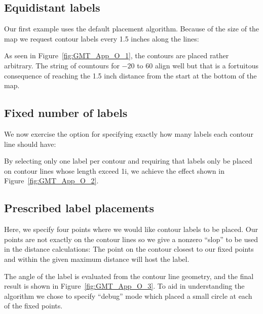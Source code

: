 \subsection{Equidistant labels}

Our first example uses the default placement algorithm.  Because of the size
of the map we request contour labels every 1.5 inches along the lines:



\noindent
As seen in Figure~\ref{fig:GMT_App_O_1}, the contours are placed rather arbitrary.
The string of countours for $-20$ to $60$ align well but that is a fortuitous 
consequence of reaching the 1.5 inch distance from the start at the bottom of the map.


\subsection{Fixed number of labels}

We now exercise the option for specifying exactly how many labels each contour line
should have:



\noindent
By selecting only one label per contour and requiring that labels only be placed on
contour lines whose length exceed 1i, we achieve the effect shown in Figure~\ref{fig:GMT_App_O_2}.


\subsection{Prescribed label placements}

Here, we specify four points where we would like contour labels to be placed.  Our points
are not exactly on the contour lines so we give a nonzero ``slop'' to be used in the
distance calculations: The point on the contour closest to our fixed points and within
the given maximum distance will host the label.



\noindent
The angle of the label is evaluated from the contour line geometry, and the final result
is shown in Figure~\ref{fig:GMT_App_O_3}.
To aid in understanding the algorithm we chose to specify ``debug'' mode which placed a
small circle at each of the fixed points.

